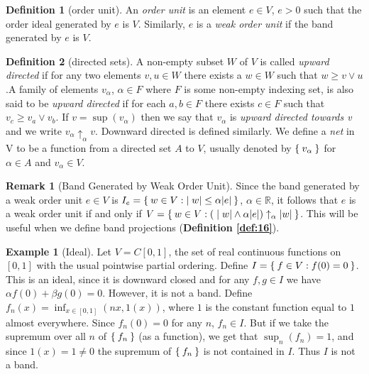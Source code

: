\documentclass[letterpaper,10pt,oneside,onecolumn,reqno]{amsart}
\newcommand{\R}{\mathbb R}
\theoremstyle{definition}
\newtheorem{defn}{Definition}
\newtheorem{rem}{Remark}
\newtheorem{exa}{Example}
\newcommand{\meet}{\wedge}
\newcommand{\join}{\vee}
\begin{document}
  \begin{defn}[order unit]\label{def:9}
    An \emph{order unit} is an element $e \in V$, $e
    > 0$ such that the order ideal generated by $e$ is $V$. Similarly,
    $e$ is a \emph{weak order unit} if the band
    generated by $e$ is $V$.
  \end{defn}
  \begin{defn}[directed sets]\label{def:10}
    A non-empty subset $W$ of $V$ is called \emph{upward directed} if for any two elements $v,u \in W$
    there exists a $w \in W$ such that $w \geq v \join u$.A family of
    elements $v_{\alpha}$, $\alpha \in F$ where $F$ is some non-empty
    indexing set, is also said to be \emph{upward directed} if for
    each $a,b \in F$ there exists $c \in F$ such that $v_c \geq v_a
    \join v_b$. If $v = \sup({v_\alpha})$ then we say that
    $v_{\alpha}$ is \emph{upward directed towards v} and we write
    $v_{\alpha}\uparrow_{\alpha} v$. Downward directed is defined
    similarly. We define a \emph{net} in V to be a function
    from a directed set $A$ to $V$, usually denoted by
    $\Set{v_{\alpha}}$ for $\alpha \in A$ and $v_{\alpha} \in V$.

    \begin{rem}[Band Generated by Weak Order Unit]\label{rem:2}
      Since the band generated by a weak order unit $e \in V$ is
      $I_{e} = \Set{w \in V: |w| \leq \alpha |e|}$, $\alpha \in \R$,
      it follows that $e$ is a weak order unit if and only if $V =
      \Set{w \in V : (|w| \meet \alpha |e|) \uparrow_{\alpha}
        |w|}$. This will be useful when we define band projections
      (\textbf{Definition \ref{def:16}}).
    \end{rem}
  \end{defn}


\begin{exa}[Ideal]\label{exa:1}
  Let $V=C[0,1]$, the set of real continuous functions on $[0,1]$ with
  the usual pointwise partial ordering. Define $I = \Set{f \in V :
    f(0) = 0}$. This is an ideal, since it is downward closed and for
  any $f,g \in I$ we have $\alpha f(0) + \beta g(0) = 0$. However, it
  is not a band. Define $f_n(x) = \inf_{x \in [0,1]}(nx, 1(x))$, where
  $1$ is the constant function equal to $1$ almost everywhere. Since
  $f_n(0) = 0$ for any $n$, $f_n \in I$. But if we take the supremum
  over all $n$ of $\Set{f_n}$ (as a function), we get that
  $\sup_n({f_n}) = 1$, and since $1(x) = 1 \neq 0$ the supremum of
  $\Set{f_n}$ is not contained in $I$. Thus $I$ is not a band.
\end{exa}
\end{document}
